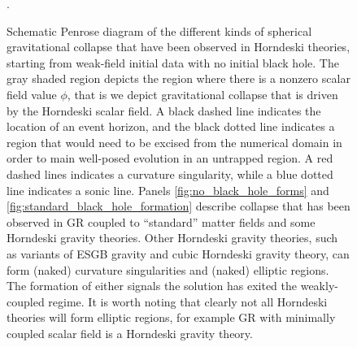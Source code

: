 \documentclass{ws-ijmpd}
\begin{document}
\begin{figure}
{
      }
   \caption{Schematic Penrose diagram of the different
   kinds of spherical 
   gravitational collapse that have been observed in Horndeski theories,
   starting from weak-field initial data with no initial black hole.
   The gray shaded region depicts the region where there is
   a nonzero scalar field value $\phi$,
   that is we depict gravitational collapse that is driven
   by the Horndeski scalar field.
   A black dashed line indicates the location of an event horizon,
   and the black dotted line indicates a region that would need
   to be excised from the numerical domain in order to main
   well-posed evolution in an untrapped region.
   A red dashed lines indicates a curvature singularity, while a
   blue dotted line indicates a sonic line.
   Panels \eqref{fig:no_black_hole_forms} and 
   \eqref{fig:standard_black_hole_formation} describe
   collapse that has been observed in GR coupled to ``standard''
   matter fields and some Horndeski gravity theories.
   Other Horndeski gravity theories, such as 
   variants of ESGB gravity and cubic Horndeski
   gravity theory, can form (naked) curvature
   singularities and (naked) elliptic 
   regions\cite{Ripley:2019hxt,Ripley:2019irj,Ripley:2019aqj,Ripley:2020vpk,
   Figueras:2020dzx,Figueras:2021abd,East:2021bqk,Corelli:2022phw,Corelli:2022pio}.
   The formation of either signals the solution has exited the
   weakly-coupled regime.
   It is worth noting that clearly not all Horndeski theories will
   form elliptic regions, for example GR with minimally coupled
   scalar field is a Horndeski gravity theory.
   \\
   \\
   \\
   \\
   \\
   }
   \label{fig:penrose_diagram_bh}.
\end{figure}
\end{document}
